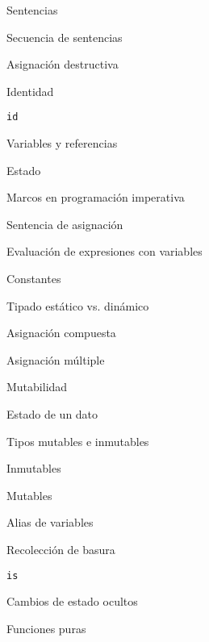 \begin{longenum}
\begin{longenum}
\begin{longenum}
            \item Sentencias
            \item Secuencia de sentencias
        \end{longenum}
        \item Asignación destructiva
        \begin{longenum}
            \item Identidad
            \begin{longenum}
                \item \texttt{id}
            \end{longenum}
            \item Variables y referencias
            \item Estado
            \item Marcos en programación imperativa
            \item Sentencia de asignación
            \item Evaluación de expresiones con variables
            \item Constantes
            \item Tipado estático vs. dinámico
            \item Asignación compuesta
            \item Asignación múltiple
        \end{longenum}
        \item Mutabilidad
        \begin{longenum}
            \item Estado de un dato
            \item Tipos mutables e inmutables
            \begin{longenum}
                \item Inmutables
                \item Mutables
            \end{longenum}
            \item Alias de variables
            \begin{longenum}
                \item Recolección de basura
                \item \texttt{is}
            \end{longenum}
        \end{longenum}
        \item Cambios de estado ocultos
        \begin{longenum}
            \item Funciones puras

\end{longenum}
\end{longenum}
\end{longenum}
